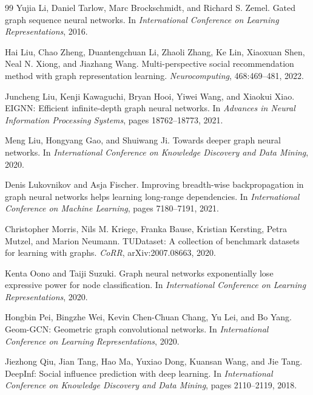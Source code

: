 \begin{thebibliography}{99}
Yujia Li, Daniel Tarlow, Marc Brockschmidt, and Richard S. Zemel.
\newblock Gated graph sequence neural networks.
\newblock In \emph{International Conference on Learning Representations}, 2016.

Hai Liu, Chao Zheng, Duantengchuan Li, Zhaoli Zhang, Ke Lin, Xiaoxuan Shen, Neal N. Xiong, and Jiazhang Wang.
\newblock Multi-perspective social recommendation method with graph representation learning.
\newblock \emph{Neurocomputing}, 468:469--481, 2022.

Juncheng Liu, Kenji Kawaguchi, Bryan Hooi, Yiwei Wang, and Xiaokui Xiao.
\newblock EIGNN: Efficient infinite-depth graph neural networks.
\newblock In \emph{Advances in Neural Information Processing Systems}, pages 18762--18773, 2021.

Meng Liu, Hongyang Gao, and Shuiwang Ji.
\newblock Towards deeper graph neural networks.
\newblock In \emph{International Conference on Knowledge Discovery and Data Mining}, 2020.

Denis Lukovnikov and Asja Fischer.
\newblock Improving breadth-wise backpropagation in graph neural networks helps learning long-range dependencies.
\newblock In \emph{International Conference on Machine Learning}, pages 7180--7191, 2021.

Christopher Morris, Nils M. Kriege, Franka Bause, Kristian Kersting, Petra Mutzel, and Marion Neumann.
\newblock TUDataset: A collection of benchmark datasets for learning with graphs.
\newblock \emph{CoRR}, arXiv:2007.08663, 2020.

Kenta Oono and Taiji Suzuki.
\newblock Graph neural networks exponentially lose expressive power for node classification.
\newblock In \emph{International Conference on Learning Representations}, 2020.

Hongbin Pei, Bingzhe Wei, Kevin Chen-Chuan Chang, Yu Lei, and Bo Yang.
\newblock Geom-GCN: Geometric graph convolutional networks.
\newblock In \emph{International Conference on Learning Representations}, 2020.

Jiezhong Qiu, Jian Tang, Hao Ma, Yuxiao Dong, Kuansan Wang, and Jie Tang.
\newblock DeepInf: Social influence prediction with deep learning.
\newblock In \emph{International Conference on Knowledge Discovery and Data Mining}, pages 2110--2119, 2018.


\end{thebibliography}
